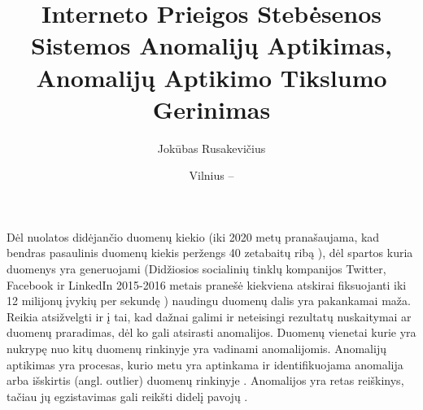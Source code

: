 \documentclass{VUMIFPSbakalaurinis}
\title{Interneto Prieigos Stebėsenos Sistemos Anomalijų Aptikimas, Anomalijų Aptikimo Tikslumo Gerinimas}
\author{Jokūbas Rusakevičius}
\date{Vilnius – \the\year}
\begin{document}
\maketitle

\setcounter{page}{2}








Dėl nuolatos didėjančio duomenų kiekio (iki 2020 metų pranašaujama, kad bendras pasaulinis duomenų kiekis peržengs 40 zetabaitų ribą \cite{future_data_volume}), dėl spartos kuria duomenys yra generuojami (Didžiosios socialinių tinklų kompanijos Twitter, Facebook ir LinkedIn 2015-2016 metais pranešė kiekviena atskirai fiksuojanti iki 12 milijonų įvykių per sekundę \cite{twitter,facebook,linkedin}) naudingu duomenų dalis yra pakankamai maža. Reikia atsižvelgti ir į tai, kad dažnai galimi ir neteisingi rezultatų nuskaitymai ar duomenų praradimas, dėl ko gali atsirasti anomalijos. Duomenų vienetai kurie yra nukrypę nuo kitų duomenų rinkinyje yra vadinami anomalijomis. Anomalijų aptikimas yra procesas, kurio metu yra aptinkama ir identifikuojama anomalija arba išskirtis (angl. outlier) duomenų rinkinyje \cite{anomaly}. Anomalijos yra retas reiškinys, tačiau jų egzistavimas gali reikšti didelį pavojų \cite{kursinis}. \par
\end{document}
